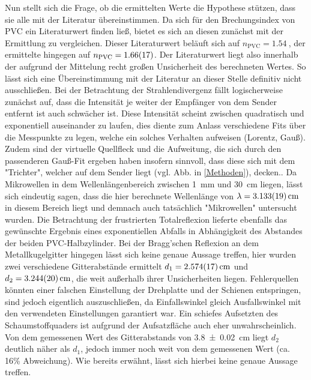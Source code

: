 		Nun stellt sich die Frage, ob die ermittelten Werte die Hypothese stützen, dass sie alle mit der Literatur übereinstimmen.
		Da sich für den Brechungsindex von PVC ein Literaturwert finden ließ, bietet es sich an diesen zunächst mit der Ermittlung zu vergleichen.
		Dieser Literaturwert\cite{GF} beläuft sich auf $n_\text{PVC} = \SI{1,54}{}$, der ermittelte hingegen auf $n_\text{PVC} = \SI{1.66+-0.17}{}$. 
		Der Literaturwert liegt also innerhalb der aufgrund der Mittelung recht großen Unsicherheit des berechneten Wertes.
		So lässt sich eine Übereinstimmung mit der Literatur an dieser Stelle definitiv nicht ausschließen.
		Bei der Betrachtung der Strahlendivergenz fällt logischerweise zunächst auf, dass die Intensität je weiter der Empfänger von dem Sender entfernt ist auch schwächer ist.
		Diese Intensität scheint zwischen quadratisch und exponentiell auseinander zu laufen, dies diente zum Anlass verschiedene Fits über die Messpunkte zu legen, welche ein solches Verhalten aufweisen (Lorentz, Gauß).
		Zudem sind der virtuelle Quellfleck und die Aufweitung, die sich durch den passenderen Gauß-Fit ergeben haben insofern sinnvoll, dass diese sich mit dem "Trichter", welcher auf dem Sender liegt (vgl. Abb. in \ref{Methoden}), decken..
		Da Mikrowellen in dem Wellenlängenbereich zwischen \SI{1}{\milli\meter} und \SI{30}{\centi\meter} liegen, lässt sich eindeutig sagen, dass die hier berechnete Wellenlänge von $\lambda = \SI{3.133+-0.019}{\centi\meter}$ in diesem Bereich liegt und demnach auch tatsächlich "Mikrowellen" untersucht wurden. 
		Die Betrachtung der frustrierten Totalreflexion lieferte ebenfalls das gewünschte Ergebnis eines exponentiellen Abfalls in Abhängigkeit des Abstandes der beiden PVC-Halbzylinder.
		Bei der Bragg'schen Reflexion an dem Metallkugelgitter hingegen lässt sich keine  genaue Aussage treffen, hier wurden zwei verschiedene Gitterabstände ermittelt $d_1 = \SI{2.574+-0.017}{\centi\meter}$ und $d_2 = \SI{3.244+-0.020}{\centi\meter}$, die weit außerhalb ihrer Unsicherheiten liegen.
		Fehlerquellen könnten einer falschen Einstellung der Drehplatte und der Schienen entspringen, sind jedoch eigentlich auszuschließen, da Einfallswinkel gleich Ausfallswinkel mit den verwendeten Einstellungen garantiert war.
		Ein schiefes Aufsetzten des Schaumstoffquaders ist aufgrund der Aufsatzfläche auch eher unwahrscheinlich.
		Von dem gemessenen Wert des Gitterabstands von \SI{3,8+-0,02}{\centi\meter} liegt $d_2$ deutlich näher als $d_1$, jedoch immer noch weit von dem gemessenen Wert (ca. 16\% Abweichung).
		Wie bereits erwähnt, lässt sich hierbei keine genaue Aussage treffen. 
		